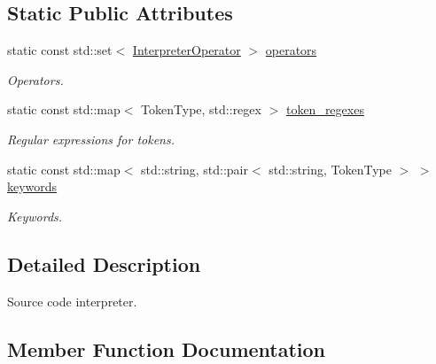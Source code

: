\subsection*{Static Public Attributes}
\begin{DoxyCompactItemize}
\item 
static const std\+::set$<$ \hyperlink{classcreek_1_1_interpreter_operator}{Interpreter\+Operator} $>$ \hyperlink{classcreek_1_1_interpreter_a0d78573d3265c0db77d32212d97ae160}{operators}\hypertarget{classcreek_1_1_interpreter_a0d78573d3265c0db77d32212d97ae160}{}\label{classcreek_1_1_interpreter_a0d78573d3265c0db77d32212d97ae160}

\begin{DoxyCompactList}\small\item\em Operators. \end{DoxyCompactList}\item 
static const std\+::map$<$ Token\+Type, std\+::regex $>$ \hyperlink{classcreek_1_1_interpreter_a69a4dbb5e0310fa4ae755d3550cdae8b}{token\+\_\+regexes}\hypertarget{classcreek_1_1_interpreter_a69a4dbb5e0310fa4ae755d3550cdae8b}{}\label{classcreek_1_1_interpreter_a69a4dbb5e0310fa4ae755d3550cdae8b}

\begin{DoxyCompactList}\small\item\em Regular expressions for tokens. \end{DoxyCompactList}\item 
static const std\+::map$<$ std\+::string, std\+::pair$<$ std\+::string, Token\+Type $>$ $>$ \hyperlink{classcreek_1_1_interpreter_ae29a4f36ba28748cd7a3ee8c98decdee}{keywords}\hypertarget{classcreek_1_1_interpreter_ae29a4f36ba28748cd7a3ee8c98decdee}{}\label{classcreek_1_1_interpreter_ae29a4f36ba28748cd7a3ee8c98decdee}

\begin{DoxyCompactList}\small\item\em Keywords. \end{DoxyCompactList}\end{DoxyCompactItemize}


\subsection{Detailed Description}
Source code interpreter. 

\subsection{Member Function Documentation}
